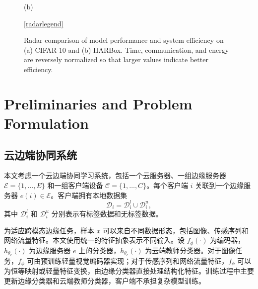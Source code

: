 \documentclass[journal]{IEEEtran}
\begin{document}
\begin{figure}[t]
\begin{minipage}{0.241\textwidth}

\vspace{0.2em}
{\scriptsize (b)}
\end{minipage}

\vspace{-2em}
\ref{radarlegend}

\caption{Radar comparison of model performance and system efficiency on (a) CIFAR-10 and (b) HARBox. Time, communication, and energy are reversely normalized so that larger values indicate better efficiency.}
\label{fig:radar_ablation}
\end{figure}
\section{Preliminaries and Problem Formulation}
\label{sec:preliminaries}

\subsection{云边端协同系统}

本文考虑一个云边端协同学习系统，包括一个云服务器、一组边缘服务器 $\mathcal{E}=\{1,\ldots,E\}$ 和一组客户端设备 $\mathcal{C}=\{1,\ldots,C\}$。每个客户端 $i$ 关联到一个边缘服务器 $e(i)\in\mathcal{E}$。客户端拥有本地数据集
\begin{equation}
    \mathcal{D}_i=\mathcal{D}_i^l\cup\mathcal{D}_i^u,
\end{equation}
其中 $\mathcal{D}_i^l$ 和 $\mathcal{D}_i^u$ 分别表示有标签数据和无标签数据。

为适应跨模态边缘任务，样本 $x$ 可以来自不同数据形态，包括图像、传感序列和网络流量特征。本文使用统一的特征抽象表示不同输入。设 $f_\phi(\cdot)$ 为编码器，$h_{\theta_e}(\cdot)$ 为边缘服务器 $e$ 上的分类器，$h_{\theta_c}(\cdot)$ 为云端教师分类器。对于图像任务，$f_\phi$ 可由预训练轻量视觉编码器实现；对于传感序列和网络流量特征，$f_\phi$ 可以为恒等映射或轻量特征变换，由边缘分类器直接处理结构化特征。训练过程中主要更新边缘分类器和云端教师分类器，客户端不承担复杂模型训练。
\end{document}
